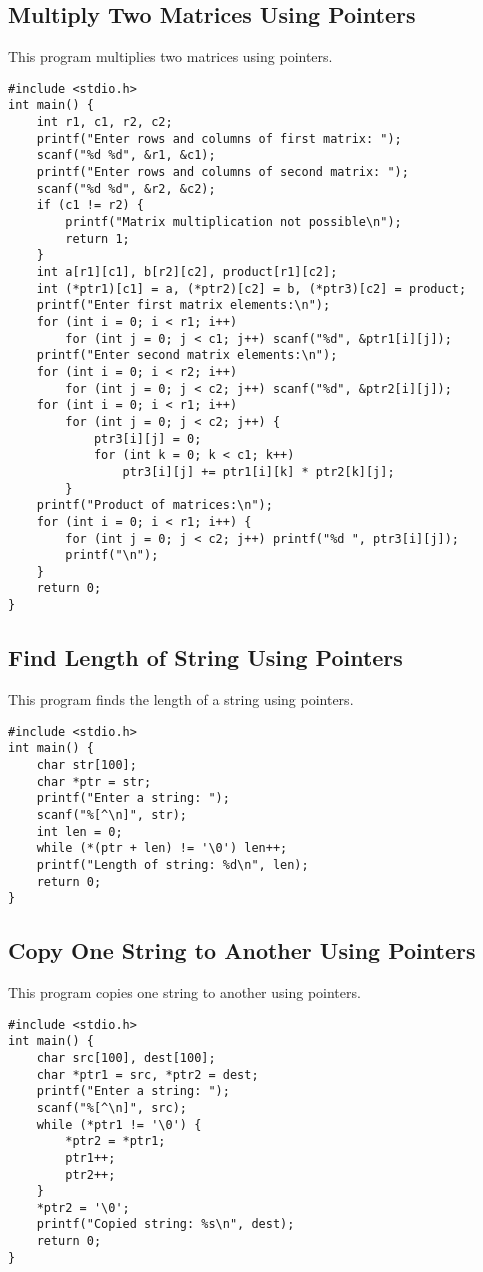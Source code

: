 \documentclass[a4paper,12pt]{article}
\begin{document}
\subsection{Multiply Two Matrices Using Pointers}
This program multiplies two matrices using pointers.
\begin{lstlisting}[caption={Multiply Two Matrices Using Pointers}]
#include <stdio.h>
int main() {
    int r1, c1, r2, c2;
    printf("Enter rows and columns of first matrix: ");
    scanf("%d %d", &r1, &c1);
    printf("Enter rows and columns of second matrix: ");
    scanf("%d %d", &r2, &c2);
    if (c1 != r2) {
        printf("Matrix multiplication not possible\n");
        return 1;
    }
    int a[r1][c1], b[r2][c2], product[r1][c2];
    int (*ptr1)[c1] = a, (*ptr2)[c2] = b, (*ptr3)[c2] = product;
    printf("Enter first matrix elements:\n");
    for (int i = 0; i < r1; i++)
        for (int j = 0; j < c1; j++) scanf("%d", &ptr1[i][j]);
    printf("Enter second matrix elements:\n");
    for (int i = 0; i < r2; i++)
        for (int j = 0; j < c2; j++) scanf("%d", &ptr2[i][j]);
    for (int i = 0; i < r1; i++)
        for (int j = 0; j < c2; j++) {
            ptr3[i][j] = 0;
            for (int k = 0; k < c1; k++)
                ptr3[i][j] += ptr1[i][k] * ptr2[k][j];
        }
    printf("Product of matrices:\n");
    for (int i = 0; i < r1; i++) {
        for (int j = 0; j < c2; j++) printf("%d ", ptr3[i][j]);
        printf("\n");
    }
    return 0;
}
\end{lstlisting}
\clearpage

\subsection{Find Length of String Using Pointers}
This program finds the length of a string using pointers.
\begin{lstlisting}[caption={Find Length of String Using Pointers}]
#include <stdio.h>
int main() {
    char str[100];
    char *ptr = str;
    printf("Enter a string: ");
    scanf("%[^\n]", str);
    int len = 0;
    while (*(ptr + len) != '\0') len++;
    printf("Length of string: %d\n", len);
    return 0;
}
\end{lstlisting}
\clearpage

\subsection{Copy One String to Another Using Pointers}
This program copies one string to another using pointers.
\begin{lstlisting}[caption={Copy One String to Another Using Pointers}]
#include <stdio.h>
int main() {
    char src[100], dest[100];
    char *ptr1 = src, *ptr2 = dest;
    printf("Enter a string: ");
    scanf("%[^\n]", src);
    while (*ptr1 != '\0') {
        *ptr2 = *ptr1;
        ptr1++;
        ptr2++;
    }
    *ptr2 = '\0';
    printf("Copied string: %s\n", dest);
    return 0;
}
\end{lstlisting}
\clearpage
\end{document}
